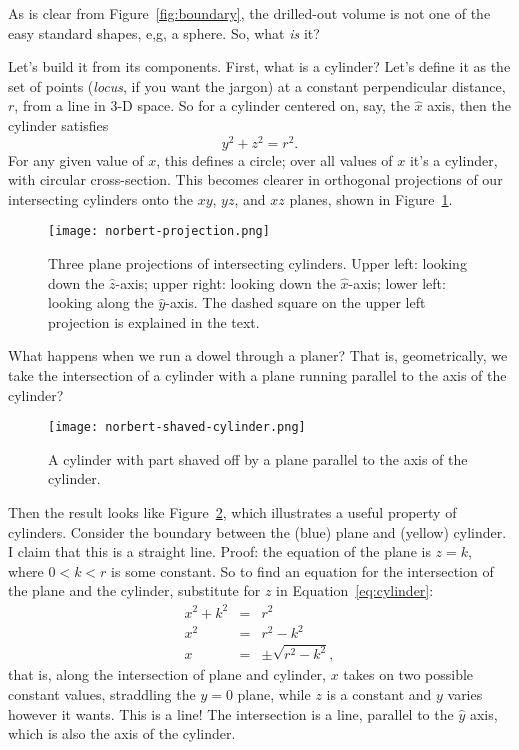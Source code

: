 \documentclass[twocolumn]{article}
\theoremstyle{definition}
\theoremstyle{plain}
\begin{document}
As is clear from Figure~\ref{fig:boundary}, the drilled-out volume is
not one of the easy standard shapes, e,g, a sphere.  So, what
\emph{is} it?

Let's build it from its components.  First, what is a cylinder?  Let's
define it as the set of points (\emph{locus}, if you want the jargon)
at a constant perpendicular distance, $r$, from a line in 3-D space.
So for a cylinder centered on, say, the $\hat{x}$ axis, then the
cylinder satisfies
\begin{equation}
  y^2 + z^2 = r^2.
\end{equation}
\label{eq:cylinder}
For any given value of $x$, this defines a circle; over all values of
$x$ it's a cylinder, with circular cross-section.
This becomes clearer in orthogonal projections of our intersecting
cylinders onto the $xy$, $yz$, and $xz$ planes, shown in
Figure~\ref{fig:projections}.
\begin{figure}
  \texttt{[image: norbert-projection.png]}
  \caption{Three plane projections of intersecting cylinders.  Upper
    left:  looking down the $\hat{z}$-axis; upper right:  looking down
    the $\hat{x}$-axis; lower left:  looking along the
    $\hat{y}$-axis.  The dashed square on the upper left projection is
    explained in the text.}
  \label{fig:projections}
\end{figure}

What happens when we run a dowel through a planer?  That is,
geometrically, we take the intersection of a cylinder with a plane
running parallel to the axis of the cylinder?
\begin{figure}
  \texttt{[image: norbert-shaved-cylinder.png]}
  \caption{A cylinder with part shaved off by a plane parallel to the
    axis of the cylinder.}
  \label{fig:shaved-cylinder}
\end{figure}
Then the result looks like Figure~\ref{fig:shaved-cylinder}, which
illustrates a useful property of cylinders.  Consider the boundary
between the (blue) plane and (yellow) cylinder.  I claim that this is
a straight line.  Proof:  the equation of the plane is $z = k$, where
$0 < k < r$ is some constant.  So to find an equation for the
intersection of the plane and the cylinder, substitute for $z$ in
Equation~\ref{eq:cylinder}:
\begin{eqnarray*}
  x^2 + k^2 & = & r^2 \\
  x^2 & = & r^2 - k^2 \\
  x & = & \pm \sqrt{r^2 - k^2},
\end{eqnarray*}
that is, along the intersection of plane and cylinder, $x$ takes on
two possible constant values, straddling the $y=0$ plane, while $z$ is
a constant and $y$ varies however it wants.  This is a line!  The
intersection is a line, parallel to the $\hat{y}$ axis, which is also
the axis of the cylinder.
\end{document}
